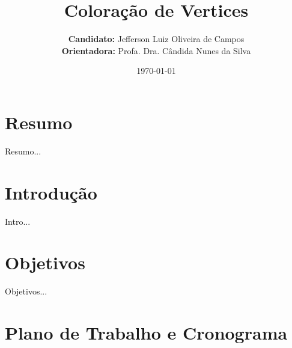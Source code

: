 \documentclass[12pt]{article}
\author{\textbf{Candidato:} Jefferson Luiz Oliveira de Campos\\
        \textbf{Orientadora:} Profa. Dra. Cândida Nunes da Silva}
\title{\textbf{Coloração de Vertices}}
\date{\today}
\begin{document}
\maketitle
\thispagestyle{empty}

\newpage
{}
\tableofcontents

\newpage
{}


\section{Resumo}

Resumo...

\section{Introdução}

Intro...


\section{Objetivos}
\label{sec:objetivos}

Objetivos... \cite{teoria_sistema_CAPRA}

\section{Plano de Trabalho e Cronograma}
\label{sec:plano}
\end{document}

